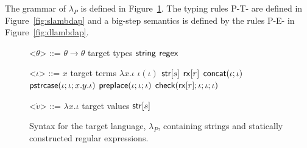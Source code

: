 \documentclass[9pt]{sig-alternate}
\theoremstyle{definition}
\newcommand{\lambdap}{\lambda_P}
\newcommand{\tcheck}[4]{{\sf check}(#1; #2; #3; #4)}
\renewcommand{\tstr}[1]{{{\sf str}[#1]}}
\newcommand{\preplace}[3]{{\sf preplace}(#1;#2;#3)}
\newcommand{\tconcat}[2]{{\sf concat}(#1;#2)} \newcommand{\concat}[2]{{\sf concat}(#1;#2)} %
\newcommand{\rx}[1]{ {\sf rx}[#1] }
\newcommand{\str}{{\sf string}}
\newcommand{\regex}{{\sf regex}}
\newcommand{\pstrcase}[3]{ {\sf pstrcase}(#1; #2; #3)}
\begin{document}
The grammar of $\lambdap$ is defined in Figure~\ref{fig:lcsSyntax}.
The typing rules \textsc{P-T-} are defined in Figure~\ref{fig:slambdap}
and a big-step semantics is defined by the rules \textsc{P-E-} in Figure~\ref{fig:dlambdap}.

\renewcommand{\grammarlabel}[2]{#1\hfill#2}

\begin{figure}[h]
\begin{grammar}

<$\theta$> ::= $\theta \rightarrow \theta$ \hfill target types \alt
$\str$ \alt $\regex$

<$\iota$> ::= $x$  \hfill target terms \alt
             $\lambda x . \iota$ \alt
                    $\iota(\iota)$ \alt
$\tstr{s}$ \alt
  $\rx{r}$ \alt
  $\tconcat{\iota}{\iota}$ \alt
  $\pstrcase{\iota}{\iota}{x.y.\iota}$ \alt
  $\preplace{\iota}{\iota}{\iota}$ \alt
  $\tcheck{\rx{r}}{\iota}{\iota}{\iota}$ 


<$\dot{v}$> ::= $\lambda x . \iota$ \hfill target values \alt
                $\tstr{s}$

\end{grammar}
\caption{Syntax for the target language, $\lambdap$, containing strings and statically constructed regular expressions.}
\label{fig:lcsSyntax}
\end{figure}
\end{document}
